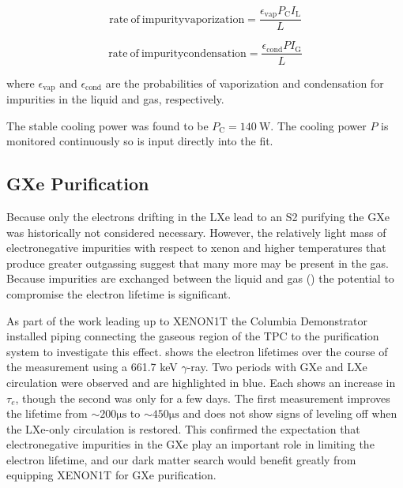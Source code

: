 \begin{equation}
\mathrm{rate\ of\ impurity vaporization} = \frac{\epsilon_{\mathrm{vap}} P_{\mathrm{C}} I_{\mathrm{L}}}{L}
\end{equation}

\begin{equation}
\mathrm{rate\ of\ impurity condensation} = \frac{\epsilon_{\mathrm{cond}} P I_{\mathrm{G}}}{L}
\end{equation}

\noindent where $\epsilon_{\mathrm{vap}}$ and $\epsilon_{\mathrm{cond}}$ are the probabilities of vaporization and condensation for
impurities in the liquid and gas, respectively.

The stable cooling power was found to be $P_{\mathrm{C}} = 140\ \mathrm{W}$.  The cooling power $P$ is monitored continuously so is input
directly into the fit.



\subsection{GXe Purification}
\label{subsec:electron_lifetime_model_gxe}
Because only the electrons drifting in the LXe lead to an S2 purifying the GXe was historically not considered necessary.  However,
the relatively light mass of electronegative impurities with respect to xenon and higher temperatures that produce greater outgassing
suggest that many more may be present in the gas.  Because
impurities are exchanged between the liquid and gas () the potential to compromise
the electron lifetime is significant.

As part of the work leading up to XENON1T the Columbia Demonstrator installed piping connecting the gaseous region of the TPC to the
purification system to investigate this effect.   shows the electron lifetimes over
the course of the measurement using a  661.7 keV $\gamma$-ray.  Two periods with GXe and LXe circulation were observed and
are highlighted in blue.  Each shows an increase in
$\tau_e$, though the second was only for a few days.  The first measurement improves the lifetime from
${\sim} 200 \mathrm{\mu s}$ to ${\sim} 450 \mathrm{\mu s}$ and does not show signs of leveling off when the LXe-only circulation is
restored.  This confirmed the expectation that electronegative impurities in the GXe play an important role in limiting the electron
lifetime, and our dark matter search would benefit greatly from equipping XENON1T for GXe purification.

